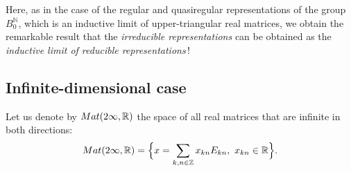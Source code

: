 \documentclass[preprint,12pt]{elsarticle}
\numberwithin{equation}{section}
\begin{document}
Here, as in the case of the regular \cite{Kos90,Kos92} and   quasiregular \cite{Kos02.2,Kos02.3} representations of the group $B^{\mathbb N}_0$,
which is an inductive limit of upper-triangular real matrices,
we obtain the remarkable result that  the {\it irreducible representations} can be obtained as the {\it inductive limit of reducible representations\,}!
%
\subsection{Infinite-dimensional case}
%
Let us denote by ${\rm Mat}(2\infty,{\mathbb R})$ the space of all
real  matrices that are infinite in both directions:
\begin{equation}
\label{5.Mat(2inf,R)} {\rm Mat}(2\infty,{\mathbb R})=
\Big\{x=\sum_{ k,n\in{\mathbb Z}}x_{kn}E_{kn},\,\,x_{kn}\in
{\mathbb R}\Big\}.
\end{equation}
\end{document}
